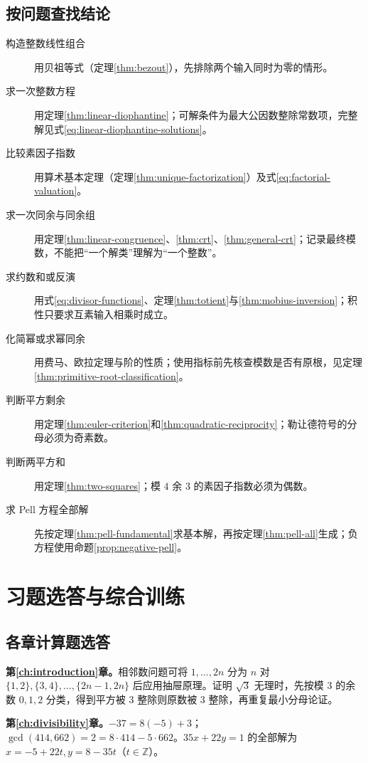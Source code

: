 \documentclass[UTF8,12pt,a4paper,fontset=fandol]{ctexbook}
\begin{document}
\section{按问题查找结论}
\begin{description}
 \item[构造整数线性组合] 用贝祖等式（定理\ref{thm:bezout}），先排除两个输入同时为零的情形。
 \item[求一次整数方程] 用定理\ref{thm:linear-diophantine}；可解条件为最大公因数整除常数项，完整解见式\eqref{eq:linear-diophantine-solutions}。
 \item[比较素因子指数] 用算术基本定理（定理\ref{thm:unique-factorization}）及式\eqref{eq:factorial-valuation}。
 \item[求一次同余与同余组] 用定理\ref{thm:linear-congruence}、\ref{thm:crt}、\ref{thm:general-crt}；记录最终模数，不能把“一个解类”理解为“一个整数”。
 \item[求约数和或反演] 用式\eqref{eq:divisor-functions}、定理\ref{thm:totient}与\ref{thm:mobius-inversion}；积性只要求互素输入相乘时成立。
 \item[化简幂或求幂同余] 用费马、欧拉定理与阶的性质；使用指标前先核查模数是否有原根，见定理\ref{thm:primitive-root-classification}。
 \item[判断平方剩余] 用定理\ref{thm:euler-criterion}和\ref{thm:quadratic-reciprocity}；勒让德符号的分母必须为奇素数。
 \item[判断两平方和] 用定理\ref{thm:two-squares}；模 $4$ 余 $3$ 的素因子指数必须为偶数。
 \item[求 Pell 方程全部解] 先按定理\ref{thm:pell-fundamental}求基本解，再按定理\ref{thm:pell-all}生成；负方程使用命题\ref{prop:negative-pell}。
\end{description}

\chapter{习题选答与综合训练}
\label{app:exercises}

\section{各章计算题选答}

\textbf{第\ref{ch:introduction}章。}相邻数问题可将 $1,\ldots,2n$ 分为 $n$ 对 $\{1,2\},\{3,4\},\ldots,\{2n-1,2n\}$ 后应用抽屉原理。证明 $\sqrt3$ 无理时，先按模 $3$ 的余数 $0,1,2$ 分类，得到平方被 $3$ 整除则原数被 $3$ 整除，再重复最小分母论证。

\textbf{第\ref{ch:divisibility}章。}$-37=8(-5)+3$；$\gcd(414,662)=2=8\cdot414-5\cdot662$。$35x+22y=1$ 的全部解为 $x=-5+22t,y=8-35t$（$t\in\mathbb Z$）。
\end{document}
